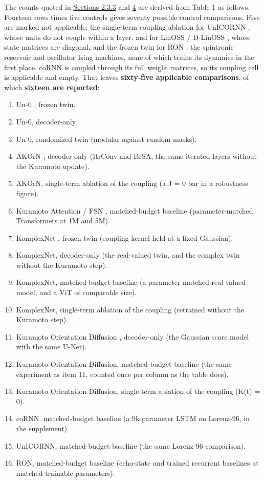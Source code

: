 \documentclass[a4paper,fleqn]{cas-sc}
\newcounter{none} %
\providecommand{\tightlist}{%
  \setlength{\itemsep}{0pt}\setlength{\parskip}{0pt}}
\begin{document}
The counts quoted in \hyperref[sec-2-3-3]{Sections 2.3.3} and
\hyperref[sec-4]{4} are derived from Table 1 as follows. Fourteen rows
times five controls gives seventy possible control comparisons. Five are
marked not applicable: the single-term coupling ablation for UnICORNN
\citep{unicornn}, whose units do not couple within a layer, and for
LinOSS \citep{rusch2025} / D-LinOSS \citep{d-linoss}, whose state
matrices are diagonal, and the frozen twin for RON \citep{ceni2024}, the
spintronic reservoir and oscillator Ising machines, none of which trains
its dynamics in the first place. coRNN \citep{rusch2021} is coupled
through its full weight matrices, so its coupling cell is applicable and
empty. That leaves \textbf{sixty-five applicable comparisons}, of which
\textbf{sixteen are reported}:

\begin{enumerate}
\def\labelenumi{\arabic{enumi}.}
\tightlist
\item
  Un-0 \citep{un-0}, frozen twin.
\item
  Un-0, decoder-only.
\item
  Un-0, randomized twin (modular against random masks).
\item
  AKOrN \citep{akorn}, decoder-only (ItrConv and ItrSA, the same
  iterated layers without the Kuramoto update).
\item
  AKOrN, single-term ablation of the coupling (a J = 0 bar in a
  robustness figure).
\item
  Kuramoto Attention \citep{kuramoto-attention} / FSN
  \citep{nunley2026}, matched-budget baseline (parameter-matched
  Transformers at 1M and 5M).
\item
  KomplexNet \citep{muzellec2025}, frozen twin (coupling kernel held at
  a fixed Gaussian).
\item
  KomplexNet, decoder-only (the real-valued twin, and the complex twin
  without the Kuramoto step).
\item
  KomplexNet, matched-budget baseline (a parameter-matched real-valued
  model, and a ViT of comparable size).
\item
  KomplexNet, single-term ablation of the coupling (retrained without
  the Kuramoto step).
\item
  Kuramoto Orientation Diffusion \citep{kuramoto-orientation-diffusion},
  decoder-only (the Gaussian score model with the same U-Net).
\item
  Kuramoto Orientation Diffusion, matched-budget baseline (the same
  experiment as item 11, counted once per column as the table does).
\item
  Kuramoto Orientation Diffusion, single-term ablation of the coupling
  (K(t) = 0).
\item
  coRNN, matched-budget baseline (a 9k-parameter LSTM on Lorenz-96, in
  the supplement).
\item
  UnICORNN, matched-budget baseline (the same Lorenz-96 comparison).
\item
  RON, matched-budget baseline (echo-state and trained recurrent
  baselines at matched trainable parameters).
\end{enumerate}
\end{document}
